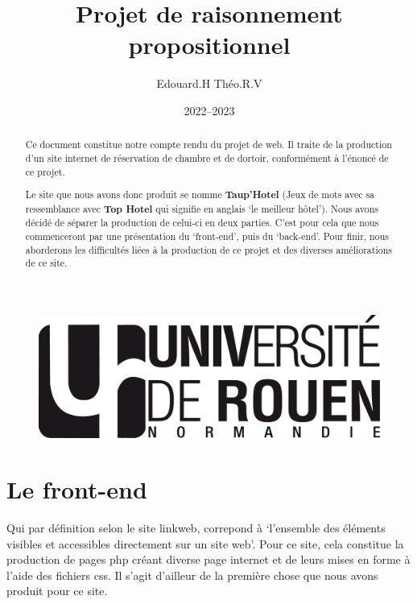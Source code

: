 \documentclass[12pt]{article}
\title{Projet de raisonnement propositionnel}
\author{Edouard.H Théo.R.V}
\date{2022--2023}
\begin{document}
    \begin{figure}
        \includegraphics[scale=0.3, right]{logo-univ-rouen-normandie-noir.png}
    \end{figure}

    \maketitle

    \begin{abstract}
        Ce document constitue notre compte rendu du projet de web. Il traite 
        de la production d'un site internet de réservation de chambre et de 
        dortoir, conformément à l'énoncé de ce projet.
        
        Le site que nous avons donc produit se nomme \textbf{Taup'Hotel}
        (Jeux de mots avec sa ressemblance avec \textbf{Top Hotel} qui signifie 
        en anglais `le meilleur hôtel'). Nous avons décidé de séparer la 
        production de celui-ci en deux parties. C'est pour cela que nous 
        commenceront par une présentation du `front-end', puis du `back-end'. 
        Pour finir, nous aborderons les difficultés liées à la production de ce 
        projet et des diverses améliorations de ce site. 
    \end{abstract}

    \newpage

    \tableofcontents

    \newpage

    \section{Le front-end}

    Qui par définition selon le site linkweb, correpond à `l'ensemble des 
    éléments visibles et accessibles directement sur un site web'. Pour ce site, 
    cela constitue la production de pages php créant diverse page internet et de
    leurs mises en forme à l'aide des fichiers css. Il s'agit d'ailleur de la 
    première chose que nous avons produit pour ce site.
\end{document}
